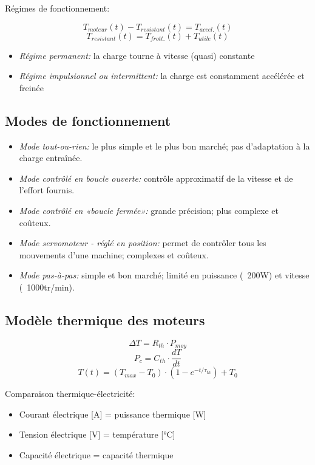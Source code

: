 \documentclass[12pt, twocolumn]{article}
\begin{document}
				Régimes de fonctionnement:
				
				\[T_{moteur}(t) - T_{resistant}(t) = T_{accel.}(t) \]
				\[T_{resistant}(t) = T_{frott.}(t) + T_{utile}(t) \]
				
				\begin{itemize}
					\item \emph{Régime permanent:} la charge tourne à vitesse (quasi) constante
					\item \emph{Régime impulsionnel ou intermittent:} la charge est constamment accélérée et freinée
				\end{itemize}
	
			\subsection*{Modes de fonctionnement}
	
				\begin{itemize}
					\item \emph{Mode tout-ou-rien:} le plus simple et le plus bon marché; pas d'adaptation à la charge entraînée.
					\item \emph{Mode contrôlé en boucle ouverte:} contrôle approximatif de la vitesse et de l'effort fournis.
					\item \emph{Mode contrôlé en «boucle fermée»:} grande précision; plus complexe et coûteux.
					\item \emph{Mode servomoteur - réglé en position:} permet de contrôler tous les mouvements d'une machine; complexes et coûteux.
					\item \emph{Mode pas-à-pas:} simple et bon marché; limité en puissance (~200W) et vitesse (~1000tr/min).
				\end{itemize}
	
		
	
			\subsection*{Modèle thermique des moteurs}
	
				\[\Delta T = R_{th} \cdot P_{moy} \]
				\[P_c = C_{th} \cdot \frac{dT}{dt} \]
				\[T(t) = (T_{max} - T_0) \cdot (1 - e^{-t/\tau_{th}}) + T_0 \]

				Comparaison thermique-électricité:
	
				\begin{itemize}
					\item Courant électrique [A] = puissance thermique [W]
					\item Tension électrique [V] = température [°C]
					\item Capacité électrique = capacité thermique
				\end{itemize}
	
\end{document}
